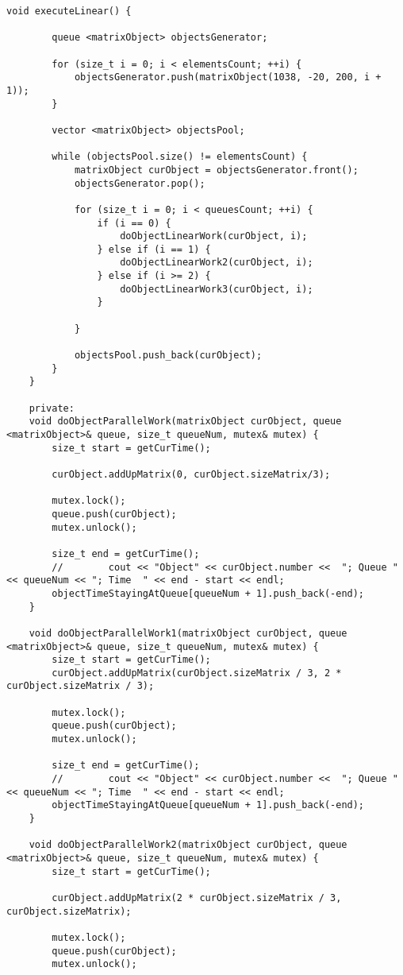 \documentclass[12pt]{report}
\begin{document}
\begin{lstlisting}[label=some-code,caption=Код программы]
	void executeLinear() {
		
		queue <matrixObject> objectsGenerator;
		
		for (size_t i = 0; i < elementsCount; ++i) {
			objectsGenerator.push(matrixObject(1038, -20, 200, i + 1));
		}
		
		vector <matrixObject> objectsPool;
		
		while (objectsPool.size() != elementsCount) {
			matrixObject curObject = objectsGenerator.front();
			objectsGenerator.pop();
			
			for (size_t i = 0; i < queuesCount; ++i) {
				if (i == 0) {
					doObjectLinearWork(curObject, i);
				} else if (i == 1) {
					doObjectLinearWork2(curObject, i);
				} else if (i >= 2) {
					doObjectLinearWork3(curObject, i);
				}
				
			}
			
			objectsPool.push_back(curObject);
		}
	}
	
	private:
	void doObjectParallelWork(matrixObject curObject, queue <matrixObject>& queue, size_t queueNum, mutex& mutex) {
		size_t start = getCurTime();
		
		curObject.addUpMatrix(0, curObject.sizeMatrix/3);
		
		mutex.lock();
		queue.push(curObject);
		mutex.unlock();
		
		size_t end = getCurTime();
		//        cout << "Object" << curObject.number <<  "; Queue " << queueNum << "; Time  " << end - start << endl;
		objectTimeStayingAtQueue[queueNum + 1].push_back(-end);
	}
	
	void doObjectParallelWork1(matrixObject curObject, queue <matrixObject>& queue, size_t queueNum, mutex& mutex) {
		size_t start = getCurTime();
		curObject.addUpMatrix(curObject.sizeMatrix / 3, 2 * curObject.sizeMatrix / 3);
		
		mutex.lock();
		queue.push(curObject);
		mutex.unlock();
		
		size_t end = getCurTime();
		//        cout << "Object" << curObject.number <<  "; Queue " << queueNum << "; Time  " << end - start << endl;
		objectTimeStayingAtQueue[queueNum + 1].push_back(-end);
	}
	
	void doObjectParallelWork2(matrixObject curObject, queue <matrixObject>& queue, size_t queueNum, mutex& mutex) {
		size_t start = getCurTime();
		
		curObject.addUpMatrix(2 * curObject.sizeMatrix / 3, curObject.sizeMatrix);
		
		mutex.lock();
		queue.push(curObject);
		mutex.unlock();
		

\end{lstlisting}
\end{document}
